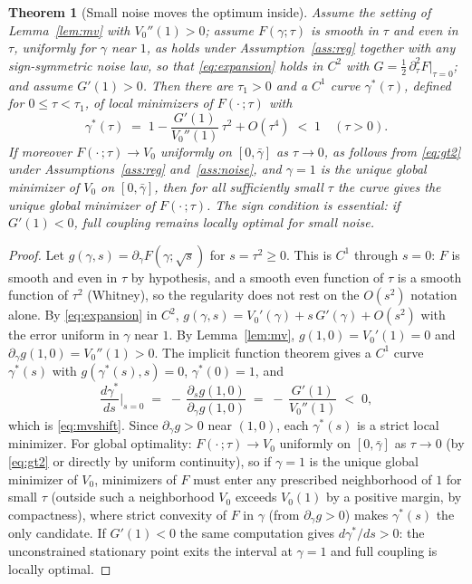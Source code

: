 \documentclass[11pt]{article}
\newtheorem{theorem}{Theorem}
\theoremstyle{remark}
\begin{document}
\begin{theorem}[Small noise moves the optimum inside]
\label{thm:mvlocal}
Assume the setting of Lemma~\ref{lem:mv} with $V_0''(1) > 0$; assume
$F(\gamma;\tau)$ is smooth in $\tau$ and even in $\tau$, uniformly for
$\gamma$ near $1$, as holds under Assumption~\ref{ass:reg} together with
any sign-symmetric noise law, so that \eqref{eq:expansion} holds in $C^2$
with $G = \tfrac12\,\partial^2_\tau F|_{\tau = 0}$; and assume
$G'(1) > 0$. Then there are $\tau_1 > 0$ and a $C^1$ curve
$\gamma^*(\tau)$, defined for $0 \le \tau < \tau_1$, of local minimizers of
$F(\cdot\,;\tau)$ with
\begin{equation}
  \gamma^*(\tau) \;=\; 1 - \frac{G'(1)}{V_0''(1)}\,\tau^2 + O(\tau^4)
  \;<\; 1 \quad (\tau > 0).
  \label{eq:mvshift}
\end{equation}
If moreover $F(\cdot\,;\tau) \to V_0$ uniformly on $[0,\bar\gamma]$ as
$\tau \to 0$, as follows from \eqref{eq:gt2} under Assumptions~\ref{ass:reg}
and~\ref{ass:noise}, and $\gamma = 1$ is the unique global minimizer of
$V_0$ on $[0,\bar\gamma]$, then for all sufficiently small $\tau$ the curve
gives the unique global minimizer of $F(\cdot\,;\tau)$. The sign condition is essential: if $G'(1) < 0$, full
coupling remains locally optimal for small noise.
\end{theorem}
\begin{proof}
Let $g(\gamma, s) = \partial_\gamma F(\gamma; \sqrt{s})$ for $s = \tau^2 \ge
0$. This is $C^1$ through $s = 0$: $F$ is smooth and even in $\tau$ by
hypothesis, and a smooth even function of $\tau$ is a
smooth function of $\tau^2$ (Whitney), so the regularity does not rest on
the $O(s^2)$ notation alone. By \eqref{eq:expansion} in $C^2$,
$g(\gamma, s) = V_0'(\gamma) + s\,G'(\gamma) + O(s^2)$ with the error
uniform in $\gamma$ near $1$. By Lemma~\ref{lem:mv}, $g(1, 0) =
V_0'(1) = 0$ and $\partial_\gamma g(1,0) = V_0''(1) > 0$. The implicit
function theorem gives a $C^1$ curve $\gamma^*(s)$ with
$g(\gamma^*(s), s) = 0$, $\gamma^*(0) = 1$, and
\[
  \frac{d\gamma^*}{ds}\Big|_{s=0}
  \;=\; -\,\frac{\partial_s g(1,0)}{\partial_\gamma g(1,0)}
  \;=\; -\,\frac{G'(1)}{V_0''(1)} \;<\; 0,
\]
which is \eqref{eq:mvshift}. Since $\partial_\gamma g > 0$ near $(1,0)$,
each $\gamma^*(s)$ is a strict local minimizer. For global optimality:
$F(\cdot\,;\tau) \to V_0$ uniformly on $[0,\bar\gamma]$ as $\tau \to 0$
(by \eqref{eq:gt2} or directly by uniform continuity), so if $\gamma = 1$
is the unique global minimizer of $V_0$, minimizers of $F$ must enter any
prescribed neighborhood of $1$ for small $\tau$ (outside such a
neighborhood $V_0$ exceeds $V_0(1)$ by a positive margin, by compactness),
where strict convexity of $F$ in
$\gamma$ (from $\partial_\gamma g > 0$) makes $\gamma^*(s)$ the only
candidate. If $G'(1) < 0$ the same computation gives
$d\gamma^*/ds > 0$: the unconstrained stationary point exits the interval
at $\gamma = 1$ and full coupling is locally optimal.
\end{proof}
\end{document}
